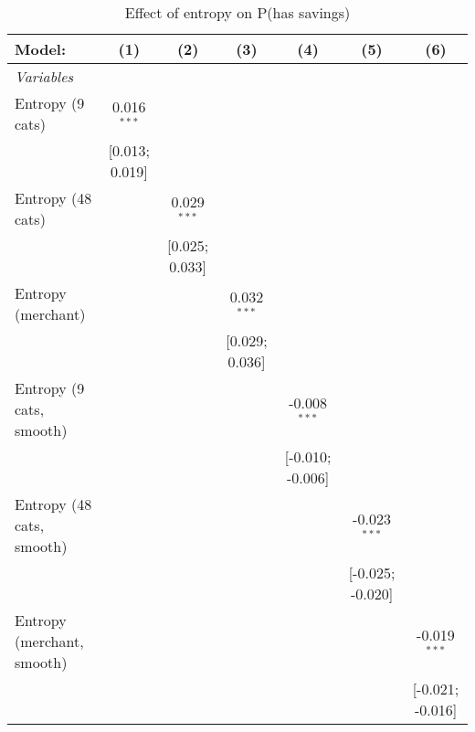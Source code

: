 
\begin{table}[htbp]
   \centering
   \tiny
   \begin{threeparttable}[b]
      \caption{\label{tab:reg_has_inflows_lag} Effect of entropy on P(has savings)}
      \begin{tabular}{lcccccc}
         \tabularnewline \midrule \midrule
         Model:                     & (1)             & (2)             & (3)             & (4)              & (5)              & (6)\\  
         \midrule
         \emph{Variables}\\
         Entropy (9 cats)           & 0.016$^{***}$   &                 &                 &                  &                  &   \\   
                                    & [0.013; 0.019]  &                 &                 &                  &                  &   \\   
         Entropy (48 cats)          &                 & 0.029$^{***}$   &                 &                  &                  &   \\   
                                    &                 & [0.025; 0.033]  &                 &                  &                  &   \\   
         Entropy (merchant)         &                 &                 & 0.032$^{***}$   &                  &                  &   \\   
                                    &                 &                 & [0.029; 0.036]  &                  &                  &   \\   
         Entropy (9 cats, smooth)   &                 &                 &                 & -0.008$^{***}$   &                  &   \\   
                                    &                 &                 &                 & [-0.010; -0.006] &                  &   \\   
         Entropy (48 cats, smooth)  &                 &                 &                 &                  & -0.023$^{***}$   &   \\   
                                    &                 &                 &                 &                  & [-0.025; -0.020] &   \\   
         Entropy (merchant, smooth) &                 &                 &                 &                  &                  & -0.019$^{***}$\\   
                                    &                 &                 &                 &                  &                  & [-0.021; -0.016]\\   

\end{tabular}
\end{threeparttable}
\end{table}
